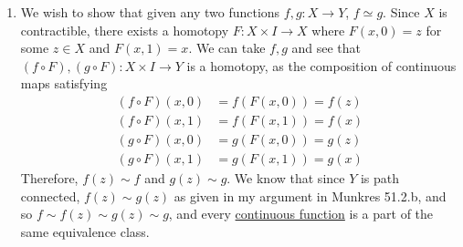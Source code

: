 \begin{solution}
\begin{enumerate}
      \item We wish to show that given any two functions $f, g: X \rightarrow Y$, $f \simeq g$. Since $X$ is contractible, there exists a homotopy $F: X \times I \rightarrow X$ where $F(x, 0) = z$ for some $z \in X$ and $F(x, 1) = x$. We can take $f, g$ and see that $(f \circ F), (g \circ F): X \times I \rightarrow Y$ is a homotopy, as the composition of continuous maps satisfying 
      \begin{align}
        (f \circ F)(x, 0) & = f(F(x, 0)) = f(z) \\ 
        (f \circ F)(x, 1) & = f(F(x, 1)) = f(x) \\ 
        (g \circ F)(x, 0) & = g(F(x, 0)) = g(z) \\ 
        (g \circ F)(x, 1) & = g(F(x, 1)) = g(x) 
      \end{align}
      Therefore, $f(z) \sim f$ and $g(z) \sim g$. We know that since $Y$ is path connected, $f(z) \sim g(z)$ as given in my argument in Munkres 51.2.b, and so $f \sim f(z) \sim g(z) \sim g$, and every \hyperref[pst-def:continuous_func]{continuous function} is a part of the same equivalence class. 
    \end{enumerate}
  \end{solution}


